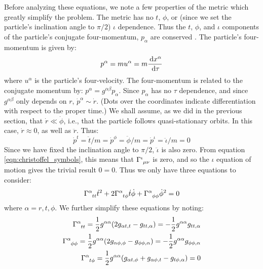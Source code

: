 Before analyzing these equations, we note a few properties of the metric which greatly simplify the problem. The metric has no $t$, $\phi$, or (since we set the particle's inclination angle to $\pi/2$) $\iota$ dependence. Thus the $t$, $\phi$, and $\iota$ components of the particle's conjugate four-momentum, $p_\alpha$ are conserved \cite{MTW, Schutz, Carroll}. The particle's four-momentum is given by:
\begin{equation}
p^{\alpha} = m u^{\alpha} = m \frac{\,\mathrm{d} x^\alpha}{\,\mathrm{d}\tau}
\end{equation}
where $u^{\alpha}$ is the particle's four-velocity. The four-momentum is related to the conjugate momentum by: $p^{\alpha} = g^{\alpha\beta}p_{\alpha}$. Since $p_{\alpha}$ has no $\tau$ dependence, and since $g^{\alpha\beta}$ only depends on $r$, $\dot{p}^{\alpha} \sim \dot{r}$. (Dots over the coordinates indicate differentiation with respect to the proper time.) We shall assume, as we did in the previous section, that $\dot{r} \ll \dot{\phi}$, i.e., that the particle follows quasi-stationary orbits. In this case, $\dot{r} \approx 0$, as well as $\ddot{r}$. Thus: 
\begin{equation}
\dot{p}^t = \ddot{t}/m = \dot{p}^\phi = \ddot{\phi}/m = \dot{p}^\iota = \ddot{\iota}/m = 0
\end{equation}
Since we have fixed the inclination angle to $\pi/2$, $\ddot{\iota}$ is also zero. From equation \ref{eqn:christoffel_symbols}, this means that $\Gamma\indices{^\iota_{\mu\nu}}$ is zero, and so the $\iota$ equation of motion gives the trivial result $0 = 0$. Thus we only have three equations to consider:
\begin{equation}
\label{eqn:equations_of_motion}
\Gamma\indices{^\alpha_{tt}} \dot{t}^2 + 2\Gamma\indices{^\alpha_{t\phi}}\dot{t}\dot{\phi} + \Gamma\indices{^\alpha_{\phi\phi}} \dot{\phi}^2 = 0 
\end{equation}
where $\alpha = r,t,\phi$. We further simplify these equations by noting:
\begin{align*}
\Gamma\indices{^\alpha_{tt}} = \frac{1}{2} g^{\alpha\alpha}(2g_{\alpha t,t} - g_{tt,\alpha}) = -\frac{1}{2} g^{\alpha\alpha}g_{tt,\alpha} \\
\Gamma\indices{^\alpha_{\phi\phi}} = \frac{1}{2} g^{\alpha\alpha}(2g_{\alpha \phi,\phi} - g_{\phi\phi,\alpha}) = -\frac{1}{2} g^{\alpha\alpha}g_{\phi\phi,\alpha} \\
\Gamma\indices{^\alpha_{t\phi}} = \frac{1}{2} g^{\alpha\alpha}(g_{\alpha t,\phi} + g_{\alpha \phi,t} - g_{t\phi,\alpha}) = 0 \\
\end{align*}
